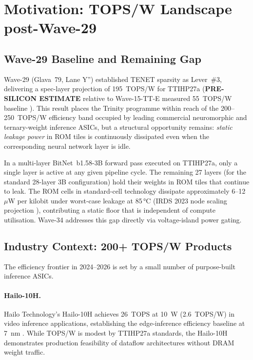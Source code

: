 \section{Motivation: TOPS/W Landscape post-Wave-29}
\label{sec:motivation}

\subsection{Wave-29 Baseline and Remaining Gap}

Wave-29 (Glava~79, Lane Y'') established TENET sparsity as Lever~\#3,
delivering a spec-layer projection of 195~TOPS/W for TTIHP27a
(\textbf{PRE-SILICON ESTIMATE} relative to Wave-15-TT-E measured 55~TOPS/W
baseline \cite{bitnet_b158_2024}).  This result places the Trinity programme
within reach of the 200--250~TOPS/W efficiency band occupied by leading
commercial neuromorphic and ternary-weight inference ASICs, but a structural
opportunity remains: \emph{static leakage power} in ROM tiles is continuously
dissipated even when the corresponding neural network layer is idle.

In a multi-layer BitNet~b1.58-3B \cite{bitnet_b158_2024} forward pass executed
on TTIHP27a, only a single layer is active at any given pipeline cycle.  The
remaining 27 layers (for the standard 28-layer 3B configuration) hold their
weights in ROM tiles that continue to leak.  The ROM cells in standard-cell
technology dissipate approximately 6--12~\(\mu\)W per kilobit under worst-case
leakage at 85\,°C (IRDS 2023 node scaling projection \cite{irds2023}),
contributing a static floor that is independent of compute utilisation.
Wave-34 addresses this gap directly via voltage-island power gating.

\subsection{Industry Context: 200+ TOPS/W Products}

The efficiency frontier in 2024--2026 is set by a small number of
purpose-built inference ASICs.

\paragraph{Hailo-10H.}  Hailo Technology's Hailo-10H achieves
26~TOPS at 10~W (2.6~TOPS/W) in video inference applications, establishing the
edge-inference efficiency baseline at 7~nm \cite{hailo10h_2024}.  While
TOPS/W is modest by TTIHP27a standards, the Hailo-10H demonstrates production
feasibility of dataflow architectures without DRAM weight traffic.


